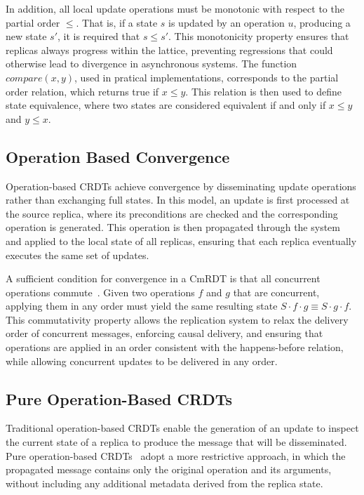 In addition, all local update operations must be monotonic with respect to the partial order $\leq$. That is, if a state $s$ is updated by an operation $u$, producing a new state $s'$, it is required that $s \leq s'$. This monotonicity property ensures that replicas always progress within the lattice, preventing regressions that could otherwise lead to divergence in asynchronous systems. The function $compare(x, y)$, used in pratical implementations, corresponds to the partial order relation, which returns true if $x \leq y$. This relation is then used to define state equivalence, where two states are considered equivalent if and only if $x \leq y$ and $y \leq x$.

\subsection{Operation Based Convergence}
\label{sub:operation_convergence}

Operation-based CRDTs achieve convergence by disseminating update operations rather than exchanging full states. In this model, an update is first processed at the source replica, where its preconditions are checked and the corresponding operation is generated. This operation is then propagated through the system and applied to the local state of all replicas, ensuring that each replica eventually executes the same set of updates.

A sufficient condition for convergence in a CmRDT is that all concurrent operations commute~\cite{shapiro2011comprehensive}. Given two operations $f$ and $g$ that are concurrent, applying them in any order must yield the same resulting state $S \cdot f \cdot g \equiv S \cdot g \cdot f$. This commutativity property allows the replication system to relax the delivery order of concurrent messages, enforcing causal delivery, and ensuring that operations are applied in an order consistent with the happens-before relation, while allowing concurrent updates to be delivered in any order.

\subsection{Pure Operation-Based CRDTs}
\label{sub:pure_operation}

Traditional operation-based CRDTs enable the generation of an update to inspect the current state of a replica to produce the message that will be disseminated. Pure operation-based CRDTs~\cite{baquero2017nested} adopt a more restrictive approach, in which the propagated message contains only the original operation and its arguments, without including any additional metadata derived from the replica state.

